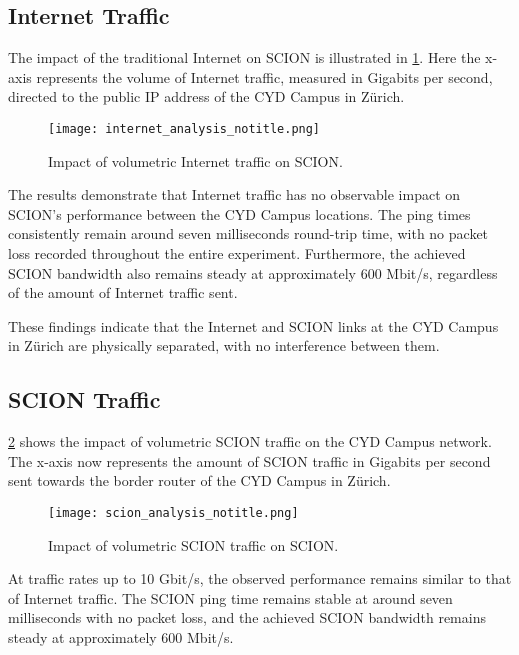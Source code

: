 \subsection{Internet Traffic}

The impact of the traditional Internet on SCION is illustrated in \cref{fig:internet_traffic}.
Here the x-axis represents the volume of Internet traffic, measured in Gigabits per second, directed to the public IP address of the CYD Campus in Zürich.

\begin{figure}[H]
    \centering
    \texttt{[image: internet\_analysis\_notitle.png]}
    \caption{Impact of volumetric Internet traffic on SCION.}
    \label{fig:internet_traffic}
\end{figure}

The results demonstrate that Internet traffic has no observable impact on SCION's performance between the CYD Campus locations.
The ping times consistently remain around seven milliseconds round-trip time, with no packet loss recorded throughout the entire experiment.
Furthermore, the achieved SCION bandwidth also remains steady at approximately 600 Mbit/s, regardless of the amount of Internet traffic sent.

These findings indicate that the Internet and SCION links at the CYD Campus in Zürich are physically separated, with no interference between them.


\subsection{SCION Traffic}

\cref{fig:scion_traffic} shows the impact of volumetric SCION traffic on the CYD Campus network.
The x-axis now represents the amount of SCION traffic in Gigabits per second sent towards the border router of the CYD Campus in Zürich.

\begin{figure}[H]
    \centering
    \texttt{[image: scion\_analysis\_notitle.png]}
    \caption{Impact of volumetric SCION traffic on SCION.}
    \label{fig:scion_traffic}
\end{figure}

At traffic rates up to 10 Gbit/s, the observed performance remains similar to that of Internet traffic.
The SCION ping time remains stable at around seven milliseconds with no packet loss, and the achieved SCION bandwidth remains steady at approximately 600 Mbit/s.

